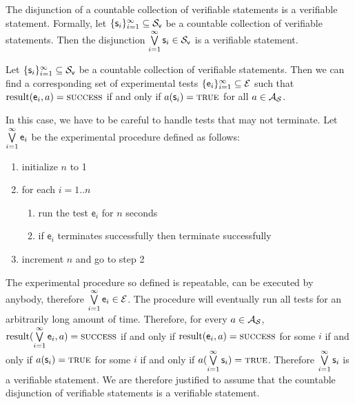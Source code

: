 \documentclass[11pt,letterpaper,fleqn]{memoir} %
\begin{document}
\begin{mathSection}
	\begin{axiom}\label{ax_verifiable_OR}
	The disjunction of a countable collection of verifiable statements is a verifiable statement. Formally, let $\{\mathsf{s}_i\}_{i=1}^{\infty} \subseteq \mathcal{S}_\textsf{v}$ be a countable collection of verifiable statements. Then the disjunction $\bigvee\limits_{i=1}^{\infty} \mathsf{s}_i \in \mathcal{S}_\textsf{v}$ is a verifiable statement.
	\end{axiom}
	\begin{justification}
		Let $\{\mathsf{s}_i\}_{i=1}^{\infty} \subseteq \mathcal{S}_\textsf{v}$ be a countable collection of verifiable statements. Then we can find a corresponding set of experimental tests $\{\mathsf{e}_i\}_{i=1}^{\infty} \subseteq \mathcal{E}$ such that $\operatorname{result}(\mathsf{e}_i, a) = \textsc{success}$ if and only if $a(\mathsf{s}_i) = \textsc{true}$ for all $a \in \mathcal{A}_{\mathcal{S}}$.
		
		
		In this case, we have to be careful to handle tests that may not terminate. Let $\bigvee\limits_{i=1}^{\infty} \mathsf{e}_i$ be the experimental procedure defined as follows:
		\begin{enumerate}
			\item initialize $n$ to 1
			\item for each $i=1..n$
			\begin{enumerate}
				\item run the test $\mathsf{e}_i$ for $n$ seconds
				\item if $\mathsf{e}_i$ terminates successfully then terminate successfully
			\end{enumerate}
			\item increment $n$ and go to step 2
		\end{enumerate}
		The experimental procedure so defined is repeatable, can be executed by anybody, therefore $\bigvee\limits_{i=1}^{\infty} \mathsf{e}_i \in \mathcal{E}$. The procedure will eventually run all tests for an arbitrarily long amount of time. Therefore, for every $a \in \mathcal{A}_{\mathcal{S}}$, $\operatorname{result}(\bigvee\limits_{i=1}^{\infty} \mathsf{e}_i, a) = \textsc{success}$ if and only if $\operatorname{result}(\mathsf{e}_i, a) = \textsc{success}$ for some $i$ if and only if $a(\mathsf{s}_i) = \textsc{true}$ for some $i$ if and only if $a(\bigvee\limits_{i=1}^{\infty}\mathsf{s}_i) = \textsc{true}$. Therefore $\bigvee\limits_{i=1}^{\infty}\mathsf{s}_i$ is a verifiable statement. We are therefore justified to assume that the countable disjunction of verifiable statements is a verifiable statement.


\end{justification}
\end{mathSection}
\end{document}
